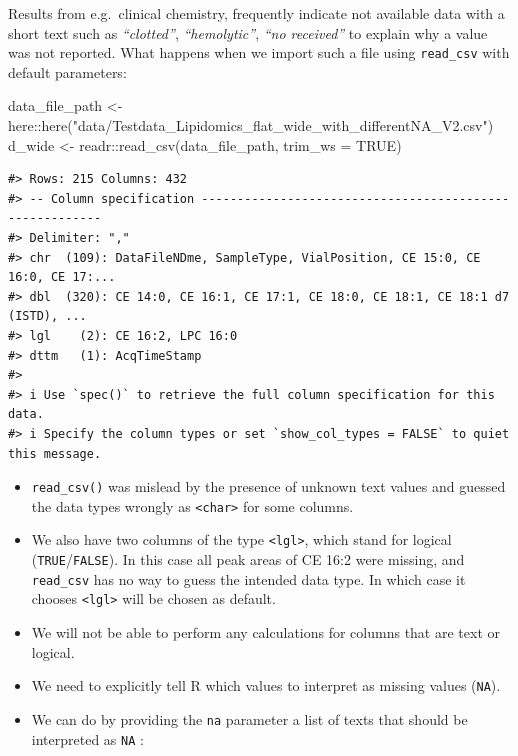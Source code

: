 \documentclass[
  letterpaper,
  DIV=11,
  numbers=noendperiod]{scrreprt}
\newenvironment{Shaded}{\begin{snugshade}}{\end{snugshade}}
\newcommand{\AttributeTok}[1]{\textcolor[rgb]{0.40,0.45,0.13}{#1}}
\newcommand{\ConstantTok}[1]{\textcolor[rgb]{0.56,0.35,0.01}{#1}}
\newcommand{\FunctionTok}[1]{\textcolor[rgb]{0.28,0.35,0.67}{#1}}
\newcommand{\NormalTok}[1]{\textcolor[rgb]{0.00,0.23,0.31}{#1}}
\newcommand{\OtherTok}[1]{\textcolor[rgb]{0.00,0.23,0.31}{#1}}
\newcommand{\SpecialCharTok}[1]{\textcolor[rgb]{0.37,0.37,0.37}{#1}}
\newcommand{\StringTok}[1]{\textcolor[rgb]{0.13,0.47,0.30}{#1}}
\providecommand{\tightlist}{%
  \setlength{\itemsep}{0pt}\setlength{\parskip}{0pt}}\usepackage{longtable,booktabs,array}
\begin{document}
Results from e.g.~clinical chemistry, frequently indicate not available
data with a short text such as \emph{``clotted''}, \emph{``hemolytic''},
\emph{``no received''} to explain why a value was not reported. What
happens when we import such a file using \texttt{read\_csv} with default
parameters:

\begin{Shaded}
\begin{Highlighting}[]
\NormalTok{data\_file\_path }\OtherTok{\textless{}{-}}\NormalTok{ here}\SpecialCharTok{::}\FunctionTok{here}\NormalTok{(}\StringTok{"data/Testdata\_Lipidomics\_flat\_wide\_with\_differentNA\_V2.csv"}\NormalTok{)}
\NormalTok{d\_wide }\OtherTok{\textless{}{-}}\NormalTok{ readr}\SpecialCharTok{::}\FunctionTok{read\_csv}\NormalTok{(data\_file\_path, }\AttributeTok{trim\_ws =} \ConstantTok{TRUE}\NormalTok{)}
\end{Highlighting}
\end{Shaded}

\begin{verbatim}
#> Rows: 215 Columns: 432
#> -- Column specification --------------------------------------------------------
#> Delimiter: ","
#> chr  (109): DataFileNDme, SampleType, VialPosition, CE 15:0, CE 16:0, CE 17:...
#> dbl  (320): CE 14:0, CE 16:1, CE 17:1, CE 18:0, CE 18:1, CE 18:1 d7 (ISTD), ...
#> lgl    (2): CE 16:2, LPC 16:0
#> dttm   (1): AcqTimeStamp
#> 
#> i Use `spec()` to retrieve the full column specification for this data.
#> i Specify the column types or set `show_col_types = FALSE` to quiet this message.
\end{verbatim}

\begin{itemize}
\tightlist
\item
  \texttt{read\_csv()} was mislead by the presence of unknown text
  values and guessed the data types wrongly as
  \texttt{\textless{}char\textgreater{}} for some columns.
\item
  We also have two columns of the type
  \texttt{\textless{}lgl\textgreater{}}, which stand for logical
  (\texttt{TRUE}/\texttt{FALSE}). In this case all peak areas of CE 16:2
  were missing, and \texttt{read\_csv} has no way to guess the intended
  data type. In which case it chooses
  \texttt{\textless{}lgl\textgreater{}} will be chosen as default.
\item
  We will not be able to perform any calculations for columns that are
  text or logical.
\item
  We need to explicitly tell R which values to interpret as missing
  values (\texttt{NA}).
\item
  We can do by providing the \texttt{na} parameter a list of texts that
  should be interpreted as \texttt{NA} :
\end{itemize}
\end{document}
